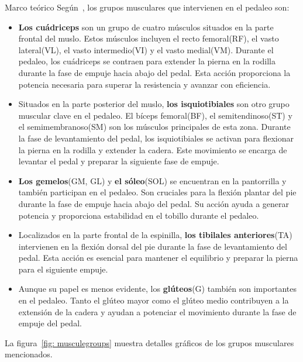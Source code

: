 \begin{thesischapter}{1} {Marco teórico}
    \vspace{10pt}
    Según~\cite{Losmúscu21}, los grupos musculares que intervienen en el pedaleo son:

    \begin{itemize}
        \item \textbf{Los cuádriceps} son un grupo de cuatro músculos situados en la parte frontal del muslo. Estos músculos incluyen el recto femoral(RF), el vasto lateral(VL), el vasto intermedio(VI) y el vasto medial(VM). Durante el pedaleo, los cuádriceps se contraen para extender la pierna en la rodilla durante la fase de empuje hacia abajo del pedal. Esta acción proporciona la potencia necesaria para superar la resistencia y avanzar con eficiencia.
        
        \item Situados en la parte posterior del muslo, \textbf{los isquiotibiales} son otro grupo muscular clave en el pedaleo. El bíceps femoral(BF), el semitendinoso(ST) y el semimembranoso(SM) son los músculos principales de esta zona. Durante la fase de levantamiento del pedal, los isquiotibiales se activan para flexionar la pierna en la rodilla y extender la cadera. Este movimiento se encarga de levantar el pedal y preparar la siguiente fase de empuje.
        
        \item \textbf{Los gemelos}(GM, GL) y \textbf{el sóleo}(SOL) se encuentran en la pantorrilla y también participan en el pedaleo. Son cruciales para la flexión plantar del pie durante la fase de empuje hacia abajo del pedal. Su acción ayuda a generar potencia y proporciona estabilidad en el tobillo durante el pedaleo.
        
        \item Localizados en la parte frontal de la espinilla, \textbf{los tibilales anteriores}(TA) intervienen en la flexión dorsal del pie durante la fase de levantamiento del pedal. Esta acción es esencial para mantener el equilibrio y preparar la pierna para el siguiente empuje.
        
        \item Aunque su papel es menos evidente, los \textbf{glúteos}(G) también son importantes en el pedaleo. Tanto el glúteo mayor como el glúteo medio contribuyen a la extensión de la cadera y ayudan a potenciar el movimiento durante la fase de empuje del pedal.
    \end{itemize}

    \vspace{10pt}
    La figura~\ref{fig: musculegroups} muestra detalles gráficos de los grupos musculares mencionados.


\end{thesischapter}
